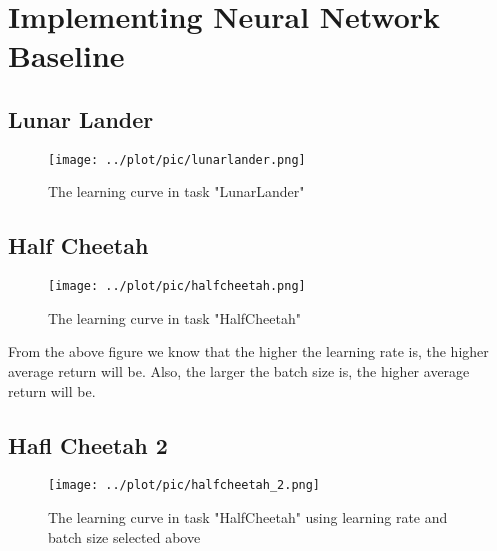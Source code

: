 \documentclass[10pt, a4paper]{ctexart}
\begin{document}
\section{Implementing Neural Network Baseline}
\subsection{Lunar Lander}
\begin{figure}[H]
    \centering
    \texttt{[image: ../plot/pic/lunarlander.png]}
    \caption{The learning curve in task "LunarLander"}
\end{figure}
\subsection{Half Cheetah}
\begin{figure}[H]
    \centering
    \texttt{[image: ../plot/pic/halfcheetah.png]}
    \caption{The learning curve in task "HalfCheetah"}
\end{figure}
From the above figure we know that the higher the learning rate is, the higher average return will be. Also, the larger the batch size is, the higher average return will be.
\subsection{Hafl Cheetah 2}
\begin{figure}[H]
    \centering
    \texttt{[image: ../plot/pic/halfcheetah\_2.png]}
    \caption{The learning curve in task "HalfCheetah" using learning rate and batch size selected above}
\end{figure}
\end{document}
